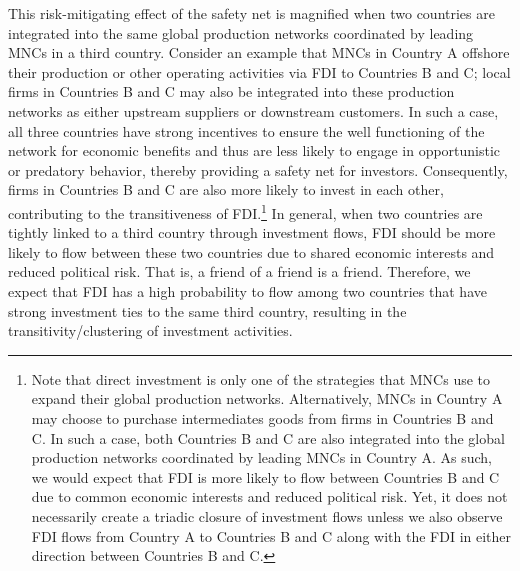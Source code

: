 \documentclass[reqno,onecolumn,letterpaper,12pt]{article}
\begin{document}
This risk-mitigating effect of the safety net is magnified when two countries are integrated into the same global production networks coordinated by leading MNCs in a third country. Consider an example that MNCs in Country A offshore their production or other operating activities via FDI to Countries B and C; local firms in Countries B and C may also be integrated into these production networks as either upstream suppliers or downstream customers. In such a case, all three countries have strong incentives to ensure the well functioning of the network for economic benefits and thus are less likely to engage in opportunistic or predatory behavior, thereby providing a safety net for investors. Consequently, firms in Countries B and C are also more likely to invest in each other, contributing to the transitiveness of FDI.\footnote{Note that direct investment is only one of the strategies that MNCs use to expand their global production networks. Alternatively, MNCs in Country A may choose to purchase intermediates goods from firms in Countries B and C. In such a case, both Countries B and C are also integrated into the global production networks coordinated by leading MNCs in Country A. As such, we would expect that FDI is more likely to flow between Countries B and C due to common economic interests and reduced political risk. Yet, it does not necessarily create a triadic closure of investment flows unless we also observe FDI flows from Country A to Countries B and C along with the FDI in either direction between Countries B and C.} In general, when two countries are tightly linked to a third country through investment flows, FDI should be more likely to flow between these two countries due to shared economic interests and reduced political risk. That is, a friend of a friend is a friend. Therefore, we expect that FDI has a high probability to flow among two countries that have strong investment ties to the same third country, resulting in the transitivity/clustering of investment activities. %
\end{document}
